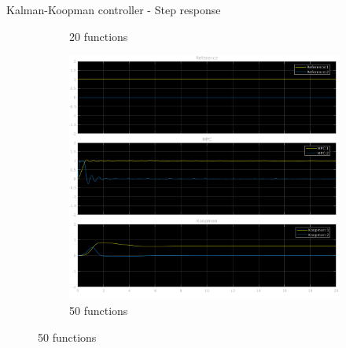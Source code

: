 \documentclass{beamer}
\begin{document}
\begin{frame}{Kalman-Koopman controller - Step response}
\begin{figure}
\begin{subfigure}[b]{0.3\textwidth}
            \caption{20 functions}
        \end{subfigure}
        \hfill
        \begin{subfigure}[b]{0.3\textwidth}
            \centering
            \includegraphics[width=\textwidth]{KK_50_Step.png}
            \caption{50 functions}
        \end{subfigure}
    \end{figure}
\end{frame}
\end{document}
